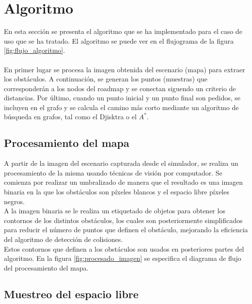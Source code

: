 \section{Algoritmo}
\label{algoritmo}

En esta sección se presenta el algoritmo que se ha implementado para el caso de uso que se ha tratado. El algoritmo se puede ver en el flujograma de la figura \ref{fig:flujo_algoritmo}. \\

\\

En primer lugar se procesa la imagen obtenida del escenario (mapa) para extraer los obstáculos. A continuación, se generan los puntos (muestras) que corresponderán a los nodos del roadmap y se conectan siguendo un criterio de distancias. Por último, cuando un punto inicial y un punto final son pedidos, se incluyen en el grafo y se calcula el camino más corto mediante un algoritmo de búsqueda en grafos, tal como el Djisktra o el $A^*$.\\

\subsection{Procesamiento del mapa}

A partir de la imagen del escenario capturada desde el simulador, se realiza un procesamiento de la misma usando técnicas de visión por computador. Se comienza por realizar un umbralizado de manera que el resultado es una imagen binaria en la que los obstáculos son píxeles blancos y el espacio libre píxeles negros. \\

A la imagen binaria se le realiza un etiquetado de objetos para obtener los contornos de los distintos obstáculos, los cuales son posteriormente simplificados para reducir el número de puntos que definen el obstáculo, mejorando la eficiencia del algoritmo de detección de colisiones.\\

Estos contornos que definen a los obstáculos son usados en posteriores partes del algoritmo. En la figura \ref{fig:procesado_imagen} se especifica el diagrama de flujo del procesamiento del mapa.


\subsection{Muestreo del espacio libre}

